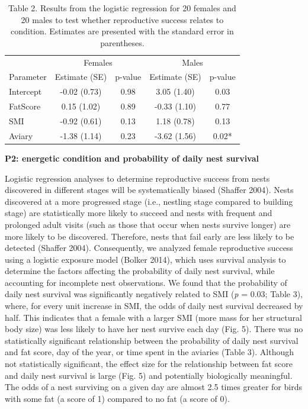 \documentclass[
]{article}
\begin{document}
\begin{table}

\caption{\label{tab:p2 main results}Table 2. Results from the logistic regression for 20 females and 20 males to test whether reproductive success relates to condition. Estimates are presented with the standard error in parentheses.}
\centering
\begin{tabular}[t]{l|c|c|c|c}
\hline
\multicolumn{1}{c|}{ } & \multicolumn{2}{c|}{Females} & \multicolumn{2}{c}{Males} \\
\cline{2-3} \cline{4-5}
Parameter & Estimate (SE) & p-value & Estimate (SE) & p-value\\
\hline
Intercept & -0.02 (0.73) & 0.98 & 3.05 (1.40) & 0.03\\
\hline
FatScore & 0.15 (1.02) & 0.89 & -0.33 (1.10) & 0.77\\
\hline
SMI & -0.92 (0.61) & 0.13 & 1.18 (0.78) & 0.13\\
\hline
Aviary & -1.38 (1.14) & 0.23 & -3.62 (1.56) & 0.02*\\
\hline
\end{tabular}
\end{table}

\pagebreak

\textbf{P2: energetic condition and probability of daily nest survival}

Logistic regression analyses to determine reproductive success from
nests discovered in different stages will be systematically biased
(Shaffer 2004). Nests discovered at a more progressed stage (i.e.,
nestling stage compared to building stage) are statistically more likely
to succeed and nests with frequent and prolonged adult visits (such as
those that occur when nests survive longer) are more likely to be
discovered. Therefore, nests that fail early are less likely to be
detected (Shaffer 2004). Consequently, we analyzed female reproductive
success using a logistic exposure model (Bolker 2014), which uses
survival analysis to determine the factors affecting the probability of
daily nest survival, while accounting for incomplete nest observations.
We found that the probability of daily nest survival was significantly
negatively related to SMI (\emph{p} = 0.03; Table 3), where, for every
unit increase in SMI, the odds of daily nest survival decreased by half.
This indicates that a female with a larger SMI (more mass for her
structural body size) was less likely to have her nest survive each day
(Fig. 5). There was no statistically significant relationship between
the probability of daily nest survival and fat score, day of the year,
or time spent in the aviaries (Table 3). Although not statistically
significant, the effect size for the relationship between fat score and
daily nest survival is large (Fig. 5) and potentially biologically
meaningful. The odds of a nest surviving on a given day are almost 2.5
times greater for birds with some fat (a score of 1) compared to no fat
(a score of 0).
\end{document}
